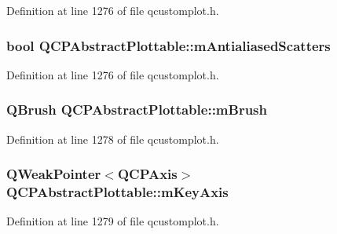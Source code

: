 Definition at line 1276 of file qcustomplot.\-h.

\hypertarget{class_q_c_p_abstract_plottable_aa115755e525a8e3a86dc683f9cab755b}{
\subsubsection[{m\-Antialiased\-Scatters}]{\setlength{\rightskip}{0pt plus 5cm}bool Q\-C\-P\-Abstract\-Plottable\-::m\-Antialiased\-Scatters\hspace{0.3cm}{\ttfamily [protected]}}}\label{class_q_c_p_abstract_plottable_aa115755e525a8e3a86dc683f9cab755b}


Definition at line 1276 of file qcustomplot.\-h.

\hypertarget{class_q_c_p_abstract_plottable_a33f00674c0161c13315ab9da0895418e}{
\subsubsection[{m\-Brush}]{\setlength{\rightskip}{0pt plus 5cm}Q\-Brush Q\-C\-P\-Abstract\-Plottable\-::m\-Brush\hspace{0.3cm}{\ttfamily [protected]}}}\label{class_q_c_p_abstract_plottable_a33f00674c0161c13315ab9da0895418e}


Definition at line 1278 of file qcustomplot.\-h.

\hypertarget{class_q_c_p_abstract_plottable_a662bf0e9cd1ef88b17d784d9fa92689d}{
\subsubsection[{m\-Key\-Axis}]{\setlength{\rightskip}{0pt plus 5cm}Q\-Weak\-Pointer$<${\bf Q\-C\-P\-Axis}$>$ Q\-C\-P\-Abstract\-Plottable\-::m\-Key\-Axis\hspace{0.3cm}{\ttfamily [protected]}}}\label{class_q_c_p_abstract_plottable_a662bf0e9cd1ef88b17d784d9fa92689d}


Definition at line 1279 of file qcustomplot.\-h.

